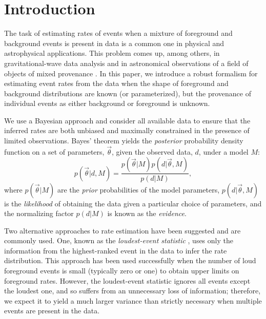 \documentclass[aps,prd,reprint,nofootinbib]{revtex4-1}
\begin{document}
\section{Introduction}

The task of estimating rates of events when a mixture of foreground
and background events is present in data is a common one in physical
and astrophysical applications.  This problem comes up, among others,
in gravitational-wave data analysis
\cite[e.g.,][]{s5-highmass,s6-lowmass} and in astronomical
observations of a field of objects of mixed provenance
\cite{DeGennaro2009}.  In this paper, we introduce a robust formalism
for estimating event rates from the data when the shape of foreground
and background distributions are known (or parameterized), but the
provenance of individual events as either background or foreground is
unknown.

We use a Bayesian approach and consider all available data to ensure
that the inferred rates are both unbiased and maximally constrained in
the presence of limited observations.  Bayes' theorem yields the
\emph{posterior} probability density function on a set of parameters,
$\vec{\theta}$, given the observed data, $d$, under a model $M$:
\begin{equation}
p(\vec{\theta} | d, M) = \frac{p(\vec{\theta}|M)
  p(d|\vec{\theta},M)}{p(d|M)},
\end{equation}
where $p(\vec{\theta}|M)$ are the \emph{prior} probabilities of the
model parameters, $p(d|\vec{\theta},M)$ is the \emph{likelihood} of
obtaining the data given a particular choice of parameters, and the
normalizing factor $p(d|M)$ is known as the \emph{evidence}.

Two alternative approaches to rate estimation have been suggested and
are commonly used.  One, known as the \emph{loudest-event statistic}
\cite{Biswas2009}, uses only the information from the highest-ranked
event in the data to infer the rate distribution.  This approach has
been used successfully \cite{s5-highmass,s6-lowmass} when the number
of loud foreground events is small (typically zero or one) to obtain
upper limits on foreground rates.  However, the loudest-event
statistic ignores all events except the loudest one, and so suffers
from an unnecessary loss of information; therefore, we expect it to
yield a much larger variance than strictly necessary when multiple
events are present in the data.
\end{document}
